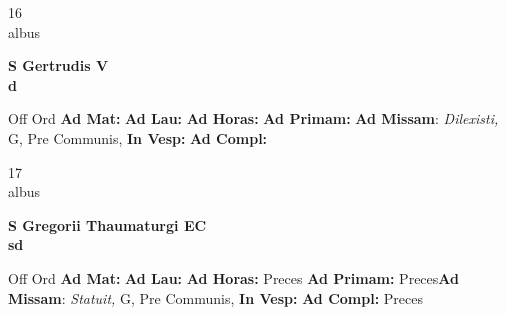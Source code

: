 \documentclass[10pt, openany]{book}
\begin{document}
    \begin{center}
        \begin{minipage}{3.5in}
            \vspace{2em}
            \begin{minipage}{0.5in}
                {\Huge 16} \\
                {\normalsize albus}
            \end{minipage}
            \begin{minipage}{3.0in}
                \textbf{ \large S Gertrudis V \\
                \textnormal{\normalsize d}}

            \end{minipage}
            \begin{justify}Off Ord
                \textbf{Ad Mat: }
                \textbf{Ad Lau: }
                \textbf{Ad Horas: }
                \textbf{Ad Primam: }\textbf{Ad Missam}: \textit{Dilexisti,} G, Pre Communis, 
                \textbf{In Vesp: }
                \textbf{Ad Compl: }
            \end{justify}
        \end{minipage}
    \end{center}

    \begin{center}
        \begin{minipage}{3.5in}
            \vspace{2em}
            \begin{minipage}{0.5in}
                {\Huge 17} \\
                {\normalsize albus}
            \end{minipage}
            \begin{minipage}{3.0in}
                \textbf{ \large S Gregorii Thaumaturgi EC \\
                \textnormal{\normalsize sd}}

            \end{minipage}
            \begin{justify}Off Ord
                \textbf{Ad Mat: }
                \textbf{Ad Lau: }
                \textbf{Ad Horas: }Preces
                \textbf{Ad Primam: }Preces\textbf{Ad Missam}: \textit{Statuit,} G, Pre Communis, 
                \textbf{In Vesp: }
                \textbf{Ad Compl: }Preces
            \end{justify}
        \end{minipage}
    \end{center}
\end{document}
